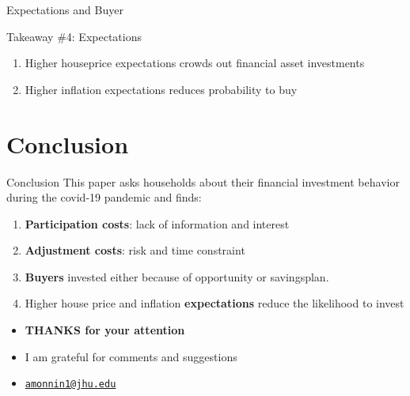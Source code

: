 \documentclass[pdflatex]{beamer}
\begin{document}
\begin{frame}{Expectations and Buyer}
	\begin{block}{Takeaway \#4: Expectations}
		{
			\begin{enumerate}
				\item Higher houseprice expectations crowds out financial asset investments
				\item Higher inflation expectations reduces probability to buy
			\end{enumerate}
		}
	\end{block}
\end{frame}

\section{Conclusion}
\begin{frame}{Conclusion}
	This paper asks households about their financial investment behavior during the covid-19 pandemic and finds:
	\vspace{1em}
	\begin{enumerate}
		\item \textbf{Participation costs}: lack of information and interest
		\item \textbf{Adjustment costs}: risk and time constraint
		\item \textbf{Buyers} invested either because of opportunity or savingsplan. 
		\item Higher house price and inflation \textbf{expectations} reduce the likelihood to invest
	\end{enumerate}
\end{frame}

\begin{frame}
	
	\begin{itemize}
		\item[] \textbf{THANKS for your attention}
		\bigskip
		\item[] I am grateful for comments and suggestions
		\smallskip
		\item[] \href{mailto:amonnin1@jhu.edu}{\texttt{amonnin1@jhu.edu} }
	\end{itemize}
	
\end{frame}

\appendix
\end{document}
